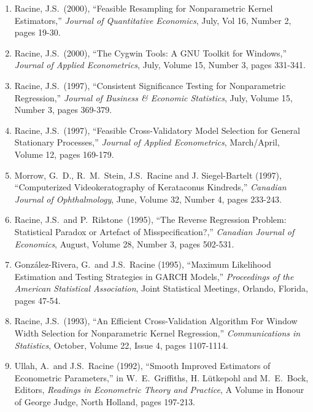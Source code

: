 \documentclass[
]{article}
\begin{document}
\begin{enumerate}
  Racine, J.S.~and J.~B.~Smith (2000), ``Nonparametric Estimation of
  Growth in Replenishable Resource Stocks,'' \emph{Advances in
  Econometrics:} Applying Kernel and Nonparametric Estimation to
  Economic Topics, R.~Carter-Hill and T.~Fomby (eds.), JAI Press Inc.,
  Volume 14, pages 309-327.
\item
  Racine, J.S.~(2000), ``Feasible Resampling for Nonparametric Kernel
  Estimators,'' \emph{Journal of Quantitative Economics}, July, Vol 16,
  Number 2, pages 19-30.
\item
  Racine, J.S.~(2000), ``The Cygwin Tools: A GNU Toolkit for Windows,''
  \emph{Journal of Applied Econometrics}, July, Volume 15, Number 3,
  pages 331-341.
\item
  Racine, J.S.~(1997), ``Consistent Significance Testing for
  Nonparametric Regression,'' \emph{Journal of Business \& Economic
  Statistics}, July, Volume 15, Number 3, pages 369-379.
\item
  Racine, J.S.~(1997), ``Feasible Cross-Validatory Model Selection for
  General Stationary Processes,'' \emph{Journal of Applied
  Econometrics}, March/April, Volume 12, pages 169-179.
\item
  Morrow, G.~D., R.~M.~Stein, J.S.~Racine and J. Siegel-Bartelt (1997),
  ``Computerized Videokeratography of Kerataconus Kindreds,''
  \emph{Canadian Journal of Ophthalmology}, June, Volume 32, Number 4,
  pages 233-243.
\item
  Racine, J.S.~and P.~Rilstone~(1995), ``The Reverse Regression Problem:
  Statistical Paradox or Artefact of Misspecification?,'' \emph{Canadian
  Journal of Economics}, August, Volume 28, Number 3, pages 502-531.
\item
  González-Rivera, G.~and J.S.~Racine (1995), ``Maximum Likelihood
  Estimation and Testing Strategies in GARCH Models,'' \emph{Proceedings
  of the American Statistical Association}, Joint Statistical Meetings,
  Orlando, Florida, pages 47-54.
\item
  Racine, J.S.~(1993), ``An Efficient Cross-Validation Algorithm For
  Window Width Selection for Nonparametric Kernel Regression,''
  \emph{Communications in Statistics}, October, Volume 22, Issue 4,
  pages 1107-1114.
\item
  Ullah, A.~and J.S.~Racine (1992), ``Smooth Improved Estimators of
  Econometric Parameters,'' in W.~E.~Griffiths, H. Lütkepohl and
  M.~E.~Bock, Editors, \emph{Readings in Econometric Theory and
  Practice}, A Volume in Honour of George Judge, North Holland, pages
  197-213.
\end{enumerate}
\end{document}
